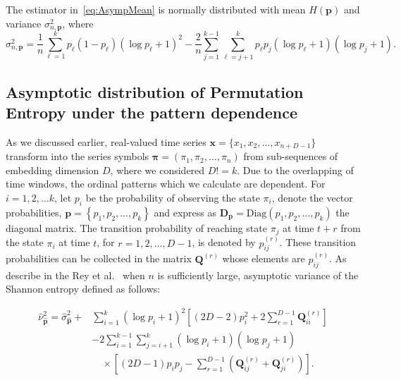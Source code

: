 The estimator in~\eqref{eq:AsympMean} is normally distributed with mean $H(\mathbf{p})$ and variance $\sigma^2_{n,\mathbf{p}}$, where
\begin{equation}
	\sigma^2_{n,\mathbf{p}}=\dfrac{1}{n}\sum_{\ell=1}^{k}p_\ell(1-p_\ell)(\log p_\ell+1)^2-\dfrac{2}{n}\sum_{j=1}^{k-1}\sum_{\ell=j+1}^{k}p_\ell p_j(\log p_\ell+1)(\log p_j+1).
\end{equation}


\subsection{Asymptotic distribution of Permutation Entropy under the pattern dependence}\label{Subsec:PatternDependence}

As we discussed earlier, real-valued time series $\mathbf{x}=\{x_1,x_2,\dots,x_{n+D-1}\}$  transform into the series symbols $\mathbf{{\pi}}=({\pi}_1, {\pi}_2,\dots, {\pi}_n)$ from sub-sequences of embedding dimension $D$, where we considered $D!=k$. Due to the overlapping of time windows, the ordinal patterns which we calculate are dependent. 
For $i=1,2,\dots k$, let $p_i$ be the probability of observing the state $\pi_i$, denote the vector probabilities, $\mathbf{p}={\left\{p_1,p_2,\dots,p_k\right\}}$ and express as $\mathbf{D_p}=\text{Diag}(p_1,p_2, \dots, p_k)$ the diagonal matrix. 
The transition probability of reaching state $\pi_j$ at time 
$t+r$ from the state $\pi_i$ at time $t$, for $r=1,2,\dots,D-1$, is denoted by $p^{(r)}_{ij}$. These transition probabilities can be collected in the matrix $\mathbf{Q}^{(r)}$ whose elements are  $p^{(r)}_{ij}$. As describe in the Rey et al.~\cite{Rey2023a} when $n$ is sufficiently large, asymptotic variance of the Shannon entropy defined as follows:

\begin{equation}
	\begin{split}
		\widehat{\nu}^2_{\widehat{\mathbf{p}}} = \widehat{\sigma}^2_{\widehat{\mathbf{p}}} + 
		& \sum_{i=1}^{k}(\log p_i + 1)^2 
		\left[ (2D - 2)p_i^2 + 2\sum_{r=1}^{D-1} \mathbf{Q}^{(r)}_{ii} \right] \\
		& - 2 \sum_{i=1}^{k-1} \sum_{j=i+1}^{k} (\log p_i + 1)(\log p_j + 1) \\
		& \quad \times \left[ (2D - 1)p_i p_j - \sum_{r=1}^{D-1} \left( \mathbf{Q}^{(r)}_{ij} + \mathbf{Q}^{(r)}_{ji} \right) \right].
	\end{split}
	\label{eq:asympvar}
\end{equation} 


